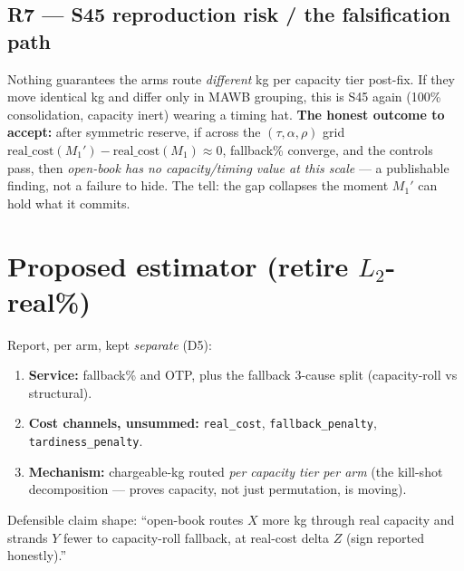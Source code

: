 \documentclass[11pt]{article}
\newcommand{\code}[1]{\texttt{#1}}
\begin{document}
\subsection{R7 --- S45 reproduction risk / the falsification path}
Nothing guarantees the arms route \emph{different} kg per capacity tier post-fix. If they move identical kg
and differ only in MAWB grouping, this is S45 again (100\% consolidation, capacity inert) wearing a timing
hat. \textbf{The honest outcome to accept:} after symmetric reserve, if across the $(\tau,\alpha,\rho)$
grid $\text{real\_cost}(M_1')-\text{real\_cost}(M_1)\approx0$, fallback\% converge, and the controls pass,
then \emph{open-book has no capacity/timing value at this scale} --- a publishable finding, not a failure to
hide. The tell: the gap collapses the moment $M_1'$ can hold what it commits.

\section{Proposed estimator (retire $L_2$-real\%)}\label{sec:estimator}
Report, per arm, kept \emph{separate} (D5):
\begin{enumerate}[leftmargin=1.4em,itemsep=0pt]
\item \textbf{Service:} fallback\% and OTP, plus the fallback 3-cause split (capacity-roll vs structural).
\item \textbf{Cost channels, unsummed:} \code{real\_cost}, \code{fallback\_penalty}, \code{tardiness\_penalty}.
\item \textbf{Mechanism:} chargeable-kg routed \emph{per capacity tier per arm} (the kill-shot
decomposition --- proves capacity, not just permutation, is moving).
\end{enumerate}
Defensible claim shape: ``open-book routes $X$ more kg through real capacity and strands $Y$ fewer to
capacity-roll fallback, at real-cost delta $Z$ (sign reported honestly).''

\end{document}
